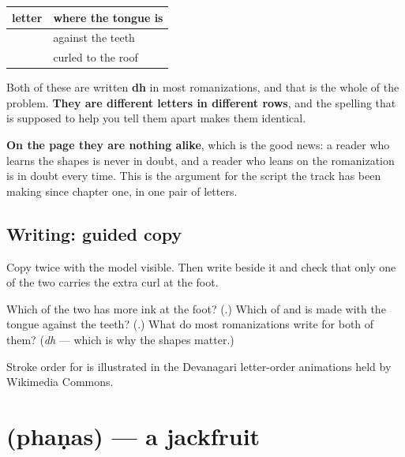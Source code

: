 \begin{grammarlens}[title={Grammar Lens: the romanization lies about this one}]
\noindent
\begin{tabularx}{\linewidth}{@{}>{\raggedright\arraybackslash}X>{\raggedright\arraybackslash}X@{}}
\toprule
\textbf{letter} & \textbf{where the tongue is} \\
\midrule
\mr{ध} & against the teeth \\
\mr{ढ} & curled to the roof \\
\bottomrule
\end{tabularx}

Both of these are written \textbf{dh} in most romanizations, and that is the whole of the problem. \textbf{They are different letters in different rows}, and the spelling that is supposed to help you tell them apart makes them identical.

\textbf{On the page they are nothing alike}, which is the good news: a reader who learns the shapes is never in doubt, and a reader who leans on the romanization is in doubt every time. This is the argument for the script the track has been making since chapter one, in one pair of letters.
\end{grammarlens}

\subsection*{Writing: guided copy}

Copy \textbf{} twice with the model visible. Then write \textbf{} beside it and check that only one of the two carries the extra curl at the foot.

\begin{tcolorbox}[breakable,colback=teal!4,colframe=teal!35!black,title={Before you move on}]
Which of the two has more ink at the foot? (\textbf{}.) Which of \textbf{} and \textbf{} is made with the tongue against the teeth? (\textbf{}.) What do most romanizations write for both of them? (\emph{dh} — which is why the shapes matter.)

Stroke order for \textbf{} is illustrated in the Devanagari letter-order animations held by Wikimedia Commons.
\end{tcolorbox}
\section[\texorpdfstring{\mr{फणस} (phaṇas)}{फणस (phaṇas)}]{ (phaṇas) — a jackfruit}

